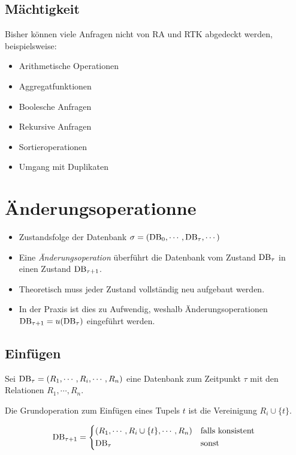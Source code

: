         \subsection{Mächtigkeit} %
        	Bisher können viele Anfragen nicht von RA und RTK abgedeckt werden, beispielsweise:
        	\begin{itemize}
        		\item Arithmetische Operationen
        		\item Aggregatfunktionen
        		\item Boolesche Anfragen
        		\item Rekursive Anfragen
        		\item Sortieroperationen
        		\item Umgang mit Duplikaten
        	\end{itemize}

    \section{Änderungsoperationne} %
        \begin{itemize}
        	\item Zustandsfolge der Datenbank \( \sigma = (\operatorname{DB}_0, \cdots, \operatorname{DB}_\tau, \cdots) \)
        	\item Eine \textit{Änderungsoperation} überführt die Datenbank vom Zustand \( \operatorname{DB}_\tau \) in einen Zustand \( \operatorname{DB}_{\tau + 1} \).
        	\item Theoretisch muss jeder Zustand vollständig neu aufgebaut werden.
        	\item In der Praxis ist dies zu Aufwendig, weshalb Änderungsoperationen \( \operatorname{DB}_{\tau+1} = u(\operatorname{DB}_\tau) \) eingeführt werden.
        \end{itemize}

        \subsection{Einfügen} %
            Sei \( \operatorname{DB}_\tau = (R_1, \cdots, R_i, \cdots, R_n) \) eine Datenbank zum Zeitpunkt \(\tau\) mit den Relationen \( R_1, \cdots, R_n \).
            
            Die Grundoperation zum Einfügen eines Tupels \( t \) ist die Vereinigung \( R_i \cup \{t\} \).
            
            \begin{equation*}
                \DB_{\tau + 1} =
                	\begin{cases*}
	                	(R_1, \cdots, R_i \cup \{t\}, \cdots, R_n) & \text{falls konsistent} \\
	                	\DB_\tau                                   & \text{sonst}
                	\end{cases*}
            \end{equation*}

